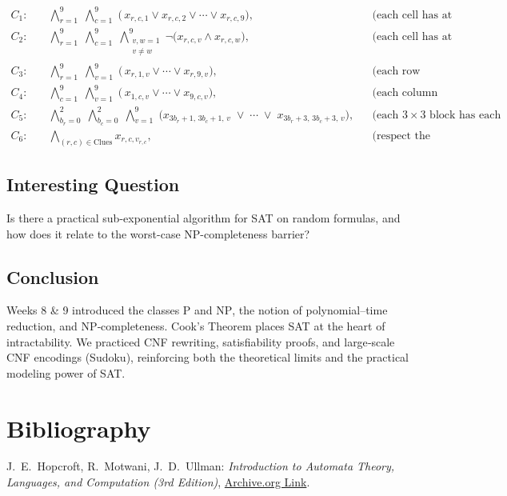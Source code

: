 \documentclass{article}
\theoremstyle{theorem}
\theoremstyle{definition}
\theoremstyle{remark}
\begin{document}
\[
\begin{aligned}
C_1{:}&\quad
\bigwedge_{r=1}^9\;\bigwedge_{c=1}^9\;\bigl(\,x_{r,c,1}\lor x_{r,c,2}\lor\cdots\lor x_{r,c,9}\bigr),
&&\text{(each cell has at least one value)}\\
C_2{:}&\quad
\bigwedge_{r=1}^9\;\bigwedge_{c=1}^9\;\bigwedge_{\substack{v,w=1\\v\neq w}}^9
\neg\bigl(x_{r,c,v}\land x_{r,c,w}\bigr),
&&\text{(each cell has at most one value)}\\
C_3{:}&\quad
\bigwedge_{r=1}^9\;\bigwedge_{v=1}^9\;\bigl(\,x_{r,1,v}\lor\cdots\lor x_{r,9,v}\bigr),
&&\text{(each row contains each value)}\\
C_4{:}&\quad
\bigwedge_{c=1}^9\;\bigwedge_{v=1}^9\;\bigl(\,x_{1,c,v}\lor\cdots\lor x_{9,c,v}\bigr),
&&\text{(each column contains each value)}\\
C_5{:}&\quad
\bigwedge_{b_r=0}^2\;\bigwedge_{b_c=0}^2\;\bigwedge_{v=1}^9
\;\bigl(x_{3b_r+1,\,3b_c+1,\,v}\;\lor\;\cdots\;\lor\;x_{3b_r+3,\,3b_c+3,\,v}\bigr),
&&\text{(each \(3\times3\) block has each value)}\\
C_6{:}&\quad
\bigwedge_{(r,c)\in\mathrm{Clues}}x_{r,c,v_{r,c}},
&&\text{(respect the given clues).}
\end{aligned}
\]

\subsection{Interesting Question}
Is there a practical sub-exponential algorithm for SAT on random formulas,
and how does it relate to the worst-case NP-completeness barrier?

\subsection{Conclusion}
Weeks 8 \& 9 introduced the classes \(\mathrm{P}\) and \(\mathrm{NP}\), the
notion of polynomial–time reduction, and NP‐completeness.  Cook’s Theorem
places SAT at the heart of intractability.  We practiced CNF rewriting,
satisfiability proofs, and large‐scale CNF encodings (Sudoku), reinforcing
both the theoretical limits and the practical modeling power of SAT.

\section{Bibliography}
\begin{thebibliography}{99}
J.~E.~Hopcroft, R.~Motwani, J.~D.~Ullman:
\emph{Introduction to Automata Theory, Languages, and Computation (3rd Edition)},
\href{https://archive.org/details/hopcroft-motwani-ullman-introduction-to-automata-theory-languages-and-computations-3rd-edition/page/65/mode/1up?view=theater}{Archive.org Link}.
\end{thebibliography}
\end{document}
